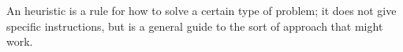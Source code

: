An heuristic is a rule for how to solve a certain type of problem; it does not
give specific instructions, but is a general guide to the sort of approach that
might work.